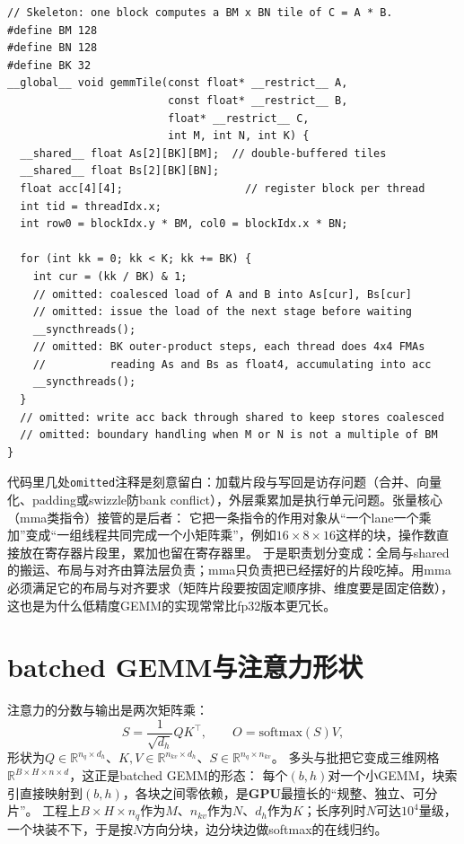 \documentclass[12pt,a4paper,fontset=fandol]{ctexbook}
\newcommand{\Tp}[1]{\texttt{#1}}
\newcommand{\Dom}[1]{\textsf{\bfseries #1}}
\newcommand{\GPU}{\Dom{GPU}}
\begin{document}
\begin{lstlisting}[style=cudastyle,caption={分块GEMM骨架：三级存储与乒乓（omitted处见说明）}]
// Skeleton: one block computes a BM x BN tile of C = A * B.
#define BM 128
#define BN 128
#define BK 32
__global__ void gemmTile(const float* __restrict__ A,
                         const float* __restrict__ B,
                         float* __restrict__ C,
                         int M, int N, int K) {
  __shared__ float As[2][BK][BM];  // double-buffered tiles
  __shared__ float Bs[2][BK][BN];
  float acc[4][4];                   // register block per thread
  int tid = threadIdx.x;
  int row0 = blockIdx.y * BM, col0 = blockIdx.x * BN;

  for (int kk = 0; kk < K; kk += BK) {
    int cur = (kk / BK) & 1;
    // omitted: coalesced load of A and B into As[cur], Bs[cur]
    // omitted: issue the load of the next stage before waiting
    __syncthreads();
    // omitted: BK outer-product steps, each thread does 4x4 FMAs
    //          reading As and Bs as float4, accumulating into acc
    __syncthreads();
  }
  // omitted: write acc back through shared to keep stores coalesced
  // omitted: boundary handling when M or N is not a multiple of BM
}
\end{lstlisting}

代码里几处\Tp{omitted}注释是刻意留白：加载片段与写回是访存问题（合并、向量化、padding或swizzle防bank conflict），外层乘累加是执行单元问题。张量核心（mma类指令）接管的是后者：
它把一条指令的作用对象从``一个lane一个乘加''变成``一组线程共同完成一个小矩阵乘''，例如$16\times 8\times 16$这样的块，操作数直接放在寄存器片段里，累加也留在寄存器里。
于是职责划分变成：全局与shared的搬运、布局与对齐由算法层负责；mma只负责把已经摆好的片段吃掉。用mma必须满足它的布局与对齐要求（矩阵片段要按固定顺序排、维度要是固定倍数），
这也是为什么低精度GEMM的实现常常比fp32版本更冗长。

\section{batched GEMM与注意力形状}

注意力的分数与输出是两次矩阵乘：
\begin{equation}
S=\frac{1}{\sqrt{d_h}}QK^{\top},\qquad
O=\mathrm{softmax}(S)V,
\end{equation}
形状为$Q\in\mathbb{R}^{n_q\times d_h}$、$K,V\in\mathbb{R}^{n_{kv}\times d_h}$、$S\in\mathbb{R}^{n_q\times n_{kv}}$。
多头与批把它变成三维网格$\mathbb{R}^{B\times H\times n\times d}$，这正是batched GEMM的形态：
每个$(b,h)$对一个小GEMM，块索引直接映射到$(b,h)$，各块之间零依赖，是\GPU{}最擅长的``规整、独立、可分片''。
工程上$B\times H\times n_q$作为$M$、$n_{kv}$作为$N$、$d_h$作为$K$；长序列时$N$可达$10^4$量级，一个块装不下，于是按$N$方向分块，边分块边做softmax的在线归约。
\end{document}
